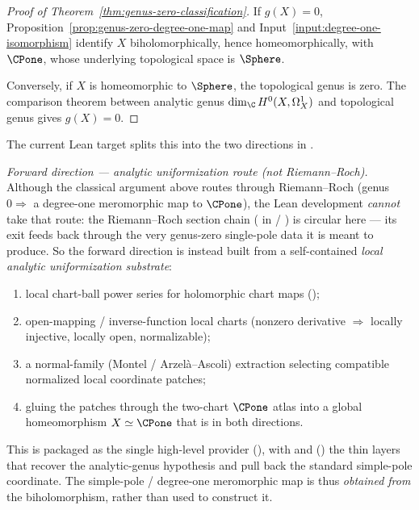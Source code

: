 \begin{proof}[Proof of Theorem~\ref{thm:genus-zero-classification}]
If \(g(X)=0\), Proposition~\ref{prop:genus-zero-degree-one-map} and
Input~\ref{input:degree-one-isomorphism} identify \(X\) biholomorphically,
hence homeomorphically, with \(\CPone\), whose underlying topological space is
\(\Sphere\).

Conversely, if \(X\) is homeomorphic to \(\Sphere\), the topological genus is
zero. The comparison theorem between analytic genus
\(\dim_{\C}H^{0}(X,\Omega^{1}_{X})\) and topological genus gives \(g(X)=0\).
\end{proof}

\begin{formalizationnote}
The current Lean target splits this into the two directions in
.

\emph{Forward direction — analytic uniformization route (not Riemann--Roch).}
Although the classical argument above routes through Riemann--Roch
(genus \(0\Rightarrow\) a degree-one meromorphic map to \(\CPone\)), the Lean
development \emph{cannot} take that route: the Riemann--Roch section chain
( in  /
) is circular here --- its
 exit feeds back through the very genus-zero
single-pole data it is meant to produce. So the forward direction is instead
built from a self-contained \emph{local analytic uniformization substrate}:
\begin{enumerate}
\item local chart-ball power series for holomorphic chart maps
  ();
\item open-mapping / inverse-function local charts (nonzero derivative
  \(\Rightarrow\) locally injective, locally open, normalizable);
\item a normal-family (Montel / Arzel\`a--Ascoli) extraction selecting
  compatible normalized local coordinate patches;
\item gluing the patches through the two-chart \(\CPone\) atlas into a global
  homeomorphism \(X\simeq\CPone\) that is  in both directions.
\end{enumerate}
This is packaged as the single high-level provider
(), with
 and
() the thin layers that recover the
analytic-genus hypothesis and pull back the standard simple-pole coordinate.
The simple-pole / degree-one meromorphic map is thus \emph{obtained from} the
biholomorphism, rather than used to construct it.


\end{formalizationnote}
